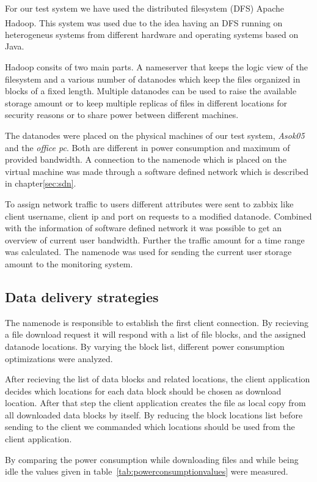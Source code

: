 For our test system we have used the distributed filesystem (DFS) Apache Hadoop\textsuperscript{\textregistered}. This system was used due to the idea having an DFS running on heterogeneus systems from different hardware and operating systems based on Java. 

Hadoop consits of two main parts. A nameserver that keeps the logic view of the filesystem and a various number of datanodes which keep the files organized in blocks of a fixed length. Multiple datanodes can be used to raise the available storage amount or to keep multiple replicas of files in different locations for security reasons or to share power between different machines. 

The datanodes were placed on the physical machines of our test system, \textit{Asok05} and the \textit{office pc}. Both are different in power consumption and maximum of provided bandwidth. A connection to the namenode which is placed on the virtual machine was made through a software defined network which is described in chapter\ref{sec:sdn}.

To assign network traffic to users different attributes were sent to zabbix like client username, client ip and port on requests to a modified datanode.
Combined with the information of software defined network it was possible to get an overview of current user bandwidth. Further the traffic amount for a time range was calculated. The namenode was used for sending the current user storage amount to the monitoring system.

\subsection{Data delivery strategies}

The namenode is responsible to establish the first client connection. By recieving a file download request it will respond with a list of file blocks, and the assigned datanode locations. By varying the block list, different power consumption optimizations were analyzed.

After recieving the list of data blocks and related locations, the client application decides which locations for each data block should be chosen as download location. After that step the client application creates the file as local copy from all downloaded data blocks by itself. By reducing the block locations list before sending to the client we commanded which locations should be used from the client application.

By comparing the power consumption while downloading files and while being idle the values given in table~\ref{tab:powerconsumptionvalues} were measured.

